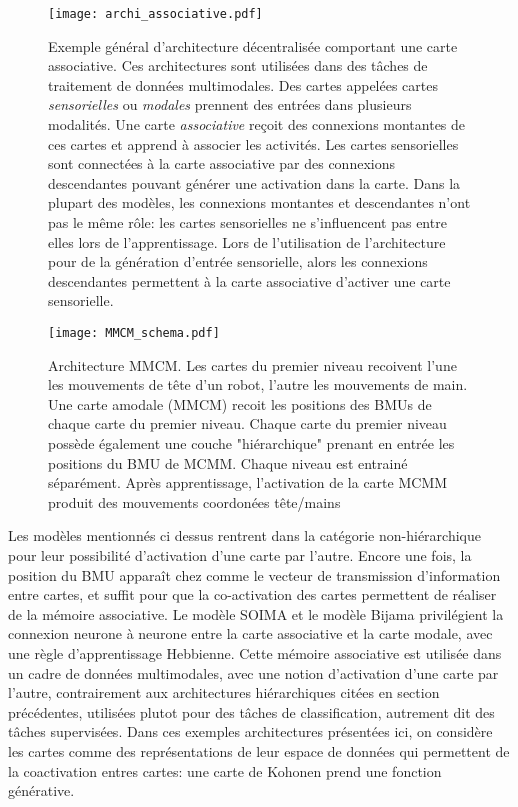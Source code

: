 \documentclass[../main]{subfiles}
\begin{document}
\begin{figure}
    \texttt{[image: archi\_associative.pdf]}
    \caption{Exemple général d'architecture décentralisée comportant une carte associative. Ces architectures sont utilisées dans des tâches de traitement de données multimodales.
     Des cartes appelées cartes \emph{sensorielles} ou \emph{modales} prennent des entrées dans plusieurs modalités. Une carte \emph{associative} reçoit des connexions montantes de ces cartes et apprend à associer les activités. Les cartes sensorielles sont connectées à la carte associative par des connexions descendantes pouvant générer une activation dans la carte. Dans la plupart des modèles, les connexions montantes et descendantes n'ont pas le même rôle: les cartes sensorielles ne s'influencent pas entre elles lors de l'apprentissage.
     Lors de l'utilisation de l'architecture pour de la génération d'entrée sensorielle, alors les connexions descendantes permettent à la carte associative d'activer une carte sensorielle. \label{fig:archi_associative}
     }
\end{figure}

\begin{figure}
    \centering
    \texttt{[image: MMCM\_schema.pdf]}
    \caption{Architecture MMCM. Les cartes du premier niveau recoivent l'une les mouvements de tête d'un robot, l'autre les mouvements de main. 
    Une carte amodale (MMCM) recoit les positions des BMUs de chaque carte du premier niveau. Chaque carte du premier niveau possède également une couche "hiérarchique" prenant en entrée les positions du BMU de MCMM. Chaque niveau est entrainé séparément.
    Après apprentissage, l'activation de la carte MCMM produit des mouvements coordonées tête/mains~\cite{dominey13}\label{fig:mmcm}}
\end{figure}

Les modèles mentionnés ci dessus rentrent dans la catégorie non-hiérarchique pour leur possibilité d'activation d'une carte par l'autre. Encore une fois, la position du BMU apparaît chez \cite{dominey13} comme le vecteur de transmission d'information  entre cartes, et suffit pour que la co-activation des cartes permettent de réaliser de la mémoire associative. Le modèle SOIMA et le modèle Bijama privilégient la connexion neurone à neurone entre la carte associative et la carte modale, avec une règle d'apprentissage Hebbienne.
Cette mémoire associative est utilisée dans un cadre de données multimodales, avec une notion d'activation d'une carte par l'autre, contrairement aux architectures hiérarchiques citées en section précédentes, utilisées plutot pour des tâches de classification, autrement dit des tâches supervisées.
Dans ces exemples architectures présentées ici, on considère les cartes comme des représentations de leur espace de données qui permettent de la coactivation entres cartes: une carte de Kohonen prend une fonction générative.
\end{document}

